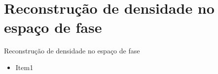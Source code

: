 \section{Reconstrução de densidade no espaço de fase}


\begin{frame}{Reconstrução de densidade no espaço de fase}

{\footnotesize
\begin{itemize}
    \setlength\itemsep{0.5em}
    \item Item1
\end{itemize}
}
\vspace{-0.2cm}
\end{frame}

